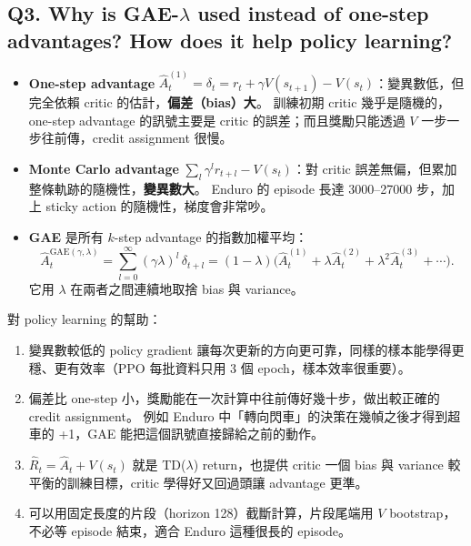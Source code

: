 \documentclass[11pt,a4paper]{article}
\begin{document}
\subsection*{Q3. Why is GAE-$\lambda$ used instead of one-step advantages? How does it help policy learning?}
\begin{itemize}[leftmargin=1.2em]
  \item \textbf{One-step advantage} $\hat A_t^{(1)}=\delta_t=r_t+\gamma V(s_{t+1})-V(s_t)$：變異數低，但完全依賴 critic 的估計，\textbf{偏差（bias）大}。
        訓練初期 critic 幾乎是隨機的，one-step advantage 的訊號主要是 critic 的誤差；而且獎勵只能透過 $V$ 一步一步往前傳，credit assignment 很慢。
  \item \textbf{Monte Carlo advantage} $\sum_l\gamma^l r_{t+l}-V(s_t)$：對 critic 誤差無偏，但累加整條軌跡的隨機性，\textbf{變異數大}。
        Enduro 的 episode 長達 3000--27000 步，加上 sticky action 的隨機性，梯度會非常吵。
  \item \textbf{GAE} 是所有 $k$-step advantage 的指數加權平均：
  \[
  \hat A_t^{\text{GAE}(\gamma,\lambda)}=\sum_{l=0}^{\infty}(\gamma\lambda)^l\,\delta_{t+l}
  =(1-\lambda)\big(\hat A_t^{(1)}+\lambda\hat A_t^{(2)}+\lambda^2\hat A_t^{(3)}+\cdots\big).
  \]
  它用 $\lambda$ 在兩者之間連續地取捨 bias 與 variance。
\end{itemize}
對 policy learning 的幫助：
\begin{enumerate}[leftmargin=1.5em]
  \item 變異數較低的 policy gradient 讓每次更新的方向更可靠，同樣的樣本能學得更穩、更有效率（PPO 每批資料只用 3 個 epoch，樣本效率很重要）。
  \item 偏差比 one-step 小，獎勵能在一次計算中往前傳好幾十步，做出較正確的 credit assignment。
        例如 Enduro 中「轉向閃車」的決策在幾幀之後才得到超車的 +1，GAE 能把這個訊號直接歸給之前的動作。
  \item $\hat R_t=\hat A_t+V(s_t)$ 就是 TD($\lambda$) return，也提供 critic 一個 bias 與 variance 較平衡的訓練目標，critic 學得好又回過頭讓 advantage 更準。
  \item 可以用固定長度的片段（horizon 128）截斷計算，片段尾端用 $V$ bootstrap，不必等 episode 結束，適合 Enduro 這種很長的 episode。
\end{enumerate}
\end{document}
